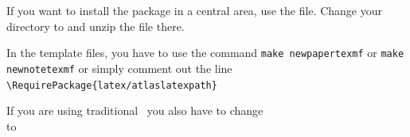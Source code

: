 If you want to install the package in a central area, use the  file.
Change your directory to  and unzip the file there.


In the template files, you have to use the command
\texttt{make newpapertexmf} or \texttt{make newnotetexmf} or simply comment out the line
\verb|\RequirePackage{latex/atlaslatexpath}|

If you are using traditional \BibTeX\ you also have to change\\
\verb|| to\\
\verb||


